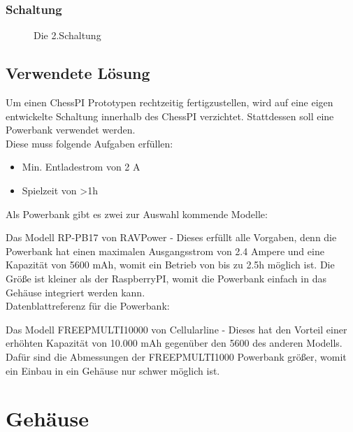 \documentclass[12pt,a4paper]{article}
\begin{document}
{\subsubsection{Schaltung}
\label{SUBSUBSEC:CIRCUIT-2}
\begin{figure}[H]
  \centering
		\caption{Die 2.Schaltung}
		\label{fig:circuit2}
\end{figure}

\newpage
\subsection{Verwendete Lösung}
\label{SUBSEC:POWERBANK}

Um einen ChessPI Prototypen rechtzeitig fertigzustellen, wird auf eine eigen entwickelte Schaltung innerhalb des ChessPI verzichtet. Stattdessen soll eine Powerbank verwendet werden. \\
Diese muss folgende Aufgaben erfüllen:
\begin{itemize}
	\item{Min. Entladestrom von 2 A}
	\item{Spielzeit von >1h}
\end{itemize}

Als Powerbank gibt es zwei zur Auswahl kommende Modelle:
\begin{itemize}
	\item{Das Modell RP-PB17 von RAVPower - Dieses erfüllt alle Vorgaben, denn die Powerbank hat einen maximalen Ausgangsstrom von 2.4 Ampere und eine Kapazität von 5600 mAh, womit ein Betrieb von bis zu 2.5h möglich ist. Die Größe ist kleiner als der RaspberryPI, womit die Powerbank einfach in das Gehäuse integriert werden kann. \\
Datenblattreferenz für die Powerbank: \cite{Powerbank}
	\item{Das Modell FREEPMULTI10000 von Cellularline - Dieses hat den Vorteil einer erhöhten Kapazität von 10.000 mAh gegenüber den 5600 des anderen Modells. Dafür sind die Abmessungen der FREEPMULTI1000 Powerbank größer, womit ein Einbau in ein Gehäuse nur schwer möglich ist.}
}
\end{itemize}

\clearpage\vfill\newpage{}
\section{Gehäuse}
\label{SEC:case}

}
\end{document}
